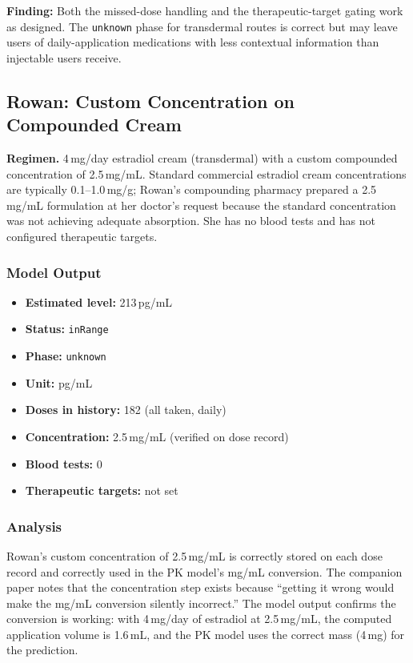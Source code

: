 \documentclass[11pt,a4paper]{article}
\newcommand{\code}[1]{\texttt{\small #1}}
\begin{document}
\textbf{Finding:} Both the missed-dose handling and the therapeutic-target
gating work as designed. The \code{unknown} phase for transdermal routes is
correct but may leave users of daily-application medications with less
contextual information than injectable users receive.

\subsection{Rowan: Custom Concentration on Compounded Cream}
\label{sec:rowan}

\textbf{Regimen.} 4\,mg/day estradiol cream (transdermal) with a custom
compounded concentration of 2.5\,mg/mL. Standard commercial estradiol cream
concentrations are typically 0.1--1.0\,mg/g; Rowan's compounding pharmacy
prepared a 2.5\,mg/mL formulation at her doctor's request because the
standard concentration was not achieving adequate absorption. She has no
blood tests and has not configured therapeutic targets.

\subsubsection{Model Output}

\begin{itemize}[nosep,leftmargin=1.4em]
\item \textbf{Estimated level:} 213\,pg/mL
\item \textbf{Status:} \code{inRange}
\item \textbf{Phase:} \code{unknown}
\item \textbf{Unit:} pg/mL
\item \textbf{Doses in history:} 182 (all taken, daily)
\item \textbf{Concentration:} 2.5\,mg/mL (verified on dose record)
\item \textbf{Blood tests:} 0
\item \textbf{Therapeutic targets:} not set
\end{itemize}

\subsubsection{Analysis}

Rowan's custom concentration of 2.5\,mg/mL is correctly stored on each dose
record and correctly used in the PK model's mg/mL conversion. The companion
paper notes that the concentration step exists because ``getting it wrong
would make the mg/mL conversion silently incorrect.'' The model output
confirms the conversion is working: with 4\,mg/day of estradiol at
2.5\,mg/mL, the computed application volume is 1.6\,mL, and the PK model
uses the correct mass (4\,mg) for the prediction.
\end{document}
